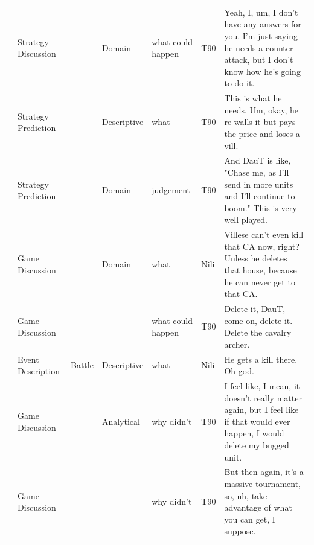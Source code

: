 {\begin{longtable}{@{}>{\theAppRow}r|L{2.3cm}L{2.2cm}L{1.4cm}L{2.2cm}L{0.5cm}U{5.6cm}@{}}
    & Strategy Discussion   &                      & Domain      & what could happen & T90     & Yeah, I, um, I don't have any answers for you. I'm just saying he needs a counter-attack, but I don't know how he's going to do it.                                                                                      \\
    & Strategy Prediction   &                      & Descriptive   & what              & T90     & This is what he needs. Um, okay, he re-walls it but pays the price and loses a vill.                                                                                                                                     \\
    & Strategy Prediction   &                      & Domain      & judgement         & T90     & And DauT is like, "Chase me, as I'll send in more units and I'll continue to boom." This is very well played.                                                                                                            \\
    & Game Discussion       &                      & Domain      & what              & Nili    & Villese can't even kill that CA now, right? Unless he deletes that house, because he can never get to that CA.                                                                                                           \\
    & Game Discussion       &                      &             & what could happen & T90     & Delete it, DauT, come on, delete it. Delete the cavalry archer.                                                                                                                                                          \\
    & Event Description     & Battle               & Descriptive   & what              & Nili    & He gets a kill there. Oh god.                                                                                                                                                                                            \\
    & Game Discussion       &                      & Analytical  & why didn't        & T90     & I feel like, I mean, it doesn't really matter again, but I feel like if that would ever happen, I would delete my bugged unit.                                                                                           \\
    & Game Discussion       &                      &             & why didn't        & T90     & But then again, it's a massive tournament, so, uh, take advantage of what you can get, I suppose.                                                                                                                        \\

\end{longtable}}
